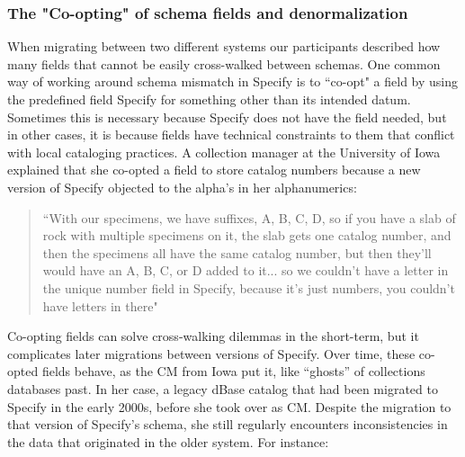 \subsubsection{The "Co-opting" of schema fields and denormalization }

When migrating between two different systems our participants described how many fields that cannot be easily cross-walked between schemas. One common way of working around schema mismatch in Specify is to “co-opt" a field by using the predefined field Specify for something other than its intended datum. Sometimes this is necessary because Specify does not have the field needed, but in other cases, it is because fields have technical constraints to them that conflict with local cataloging practices. A collection manager at the University of Iowa explained that she co-opted a field to store catalog numbers because a new version of Specify objected to the alpha’s in her alphanumerics:
\begin{quote}
“With our specimens, we have suffixes, A, B, C, D, so if you have a slab of rock with multiple specimens on it, the slab gets one catalog number, and then the specimens all have the same catalog number, but then they'll would have an A, B, C, or D added to it... so we couldn't have a letter in the unique number field in Specify, because it's just numbers, you couldn't have letters in there"
\end{quote}

Co-opting fields can solve cross-walking dilemmas in the short-term, but it complicates later migrations between versions of Specify. Over time, these co-opted fields behave, as the CM from Iowa put it, like “ghosts” of collections databases past. In her case, a legacy dBase catalog that had been migrated to Specify in the early 2000s, before she took over as CM. Despite the migration to that version of Specify's schema, she still regularly encounters inconsistencies in the data that originated in the older system. For instance: 

